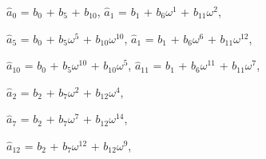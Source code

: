 \begin{center}
\vspace{10pt}
$\hat a_0$ \hspace{6pt}=\hspace{1pt} $b_0$ +\hspace{1pt} $b_5$ \hspace{18pt}+ $b_{10}$, \hspace{40pt} $\hat a_1$ \hspace{9pt}= $b_1$ \hspace{3pt}+ $b_6\omega^1$ \hspace{5pt}+ $b_{11}\omega^2$, \ 

\vspace{1pt}
$\hat a_5$ \hspace{6pt}=\hspace{1pt} $b_0$ +\hspace{1pt} $b_5\omega^5$ \hspace{8pt}+ $b_{10}\omega^{10}$, \hspace{25pt} $\hat a_1$ \hspace{9pt}= $b_1$ \hspace{3pt}+ $b_6\omega^6$ \hspace{4pt}+ $b_{11}\omega^{12}$,

\vspace{1pt}
$\hat a_{10}$ \hspace{3pt}=\hspace{1pt} $b_0$ +\hspace{1pt} $b_5\omega^{10}$ \hspace{4pt}+ $b_{10}\omega^{5}$, \hspace{28pt} $\hat a_{11}$ \hspace{6pt}= $b_1$ \hspace{3pt}+ $b_6\omega^{11}$ \hspace{1pt}+ $b_{11}\omega^{7}$, \hspace{24pt}
\end{center}

\begin{center}
$\hat a_2$ \hspace{6pt}=\hspace{1pt} $b_2$ +\hspace{1pt} $b_7\omega^2$ \hspace{8pt}+ $b_{12}\omega^4$, \ 

\vspace{1pt}
$\hat a_7$ \hspace{6pt}=\hspace{1pt} $b_2$ +\hspace{1pt} $b_7\omega^7$ \hspace{8pt}+ $b_{12}\omega^{14}$,\ 

\vspace{1pt}
$\hat a_{12}$ \hspace{3pt}=\hspace{1pt} $b_2$ +\hspace{1pt} $b_7\omega^{12}$ \hspace{4pt}+ $b_{12}\omega^{9}$, \hspace{24pt}
\end{center}

